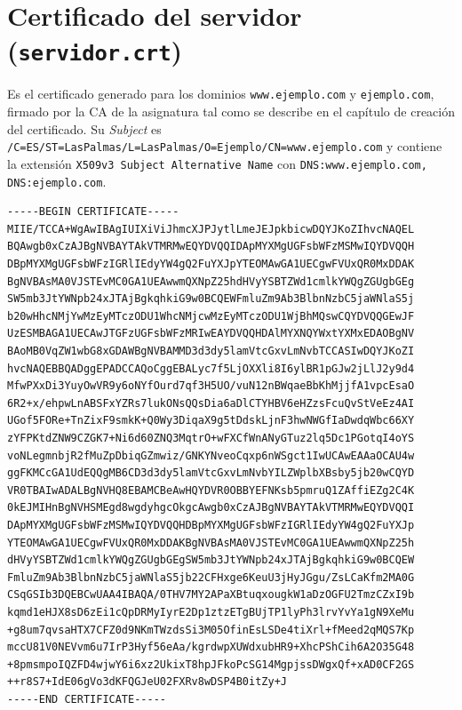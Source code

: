 \section{Certificado del servidor (\texttt{servidor.crt})}
Es el certificado generado para los dominios \texttt{www.ejemplo.com} y \texttt{ejemplo.com}, firmado por la CA de la asignatura tal como se describe en el capítulo de creación del certificado. Su \emph{Subject} es \texttt{/C=ES/ST=LasPalmas/L=LasPalmas/O=Ejemplo/CN=www.ejemplo.com} y contiene la extensión \texttt{X509v3 Subject Alternative Name} con \texttt{DNS:www.ejemplo.com, DNS:ejemplo.com}.

\begin{lstlisting}[basicstyle=\ttfamily\scriptsize, caption={servidor.crt en formato PEM}]
-----BEGIN CERTIFICATE-----
MIIE/TCCA+WgAwIBAgIUIXiViJhmcXJPJytlLmeJEJpkbicwDQYJKoZIhvcNAQEL
BQAwgb0xCzAJBgNVBAYTAkVTMRMwEQYDVQQIDApMYXMgUGFsbWFzMSMwIQYDVQQH
DBpMYXMgUGFsbWFzIGRlIEdyYW4gQ2FuYXJpYTEOMAwGA1UECgwFVUxQR0MxDDAK
BgNVBAsMA0VJSTEvMC0GA1UEAwwmQXNpZ25hdHVyYSBTZWd1cmlkYWQgZGUgbGEg
SW5mb3JtYWNpb24xJTAjBgkqhkiG9w0BCQEWFmluZm9Ab3BlbnNzbC5jaWNlaS5j
b20wHhcNMjYwMzEyMTczODU1WhcNMjcwMzEyMTczODU1WjBhMQswCQYDVQQGEwJF
UzESMBAGA1UECAwJTGFzUGFsbWFzMRIwEAYDVQQHDAlMYXNQYWxtYXMxEDAOBgNV
BAoMB0VqZW1wbG8xGDAWBgNVBAMMD3d3dy5lamVtcGxvLmNvbTCCASIwDQYJKoZI
hvcNAQEBBQADggEPADCCAQoCggEBALyc7f5LjOXXli8I6ylBR1pGJw2jLlJ2y9d4
MfwPXxDi3YuyOwVR9y6oNYfOurd7qf3H5UO/vuN12nBWqaeBbKhMjjfA1vpcEsaO
6R2+x/ehpwLnABSFxYZRs7lukONsQQsDia6aDlCTYHBV6eHZzsFcuQvStVeEz4AI
UGof5FORe+TnZixF9smkK+Q0Wy3DiqaX9g5tDdskLjnF3hwNWGfIaDwdqWbc66XY
zYFPKtdZNW9CZGK7+Ni6d60ZNQ3MqtrO+wFXCfWnANyGTuz2lq5Dc1PGotqI4oYS
voNLegmnbjR2fMuZpDbiqGZmwiz/GNKYNveoCqxp6nWSgct1IwUCAwEAAaOCAU4w
ggFKMCcGA1UdEQQgMB6CD3d3dy5lamVtcGxvLmNvbYILZWplbXBsby5jb20wCQYD
VR0TBAIwADALBgNVHQ8EBAMCBeAwHQYDVR0OBBYEFNKsb5pmruQ1ZAffiEZg2C4K
0kEJMIHnBgNVHSMEgd8wgdyhgcOkgcAwgb0xCzAJBgNVBAYTAkVTMRMwEQYDVQQI
DApMYXMgUGFsbWFzMSMwIQYDVQQHDBpMYXMgUGFsbWFzIGRlIEdyYW4gQ2FuYXJp
YTEOMAwGA1UECgwFVUxQR0MxDDAKBgNVBAsMA0VJSTEvMC0GA1UEAwwmQXNpZ25h
dHVyYSBTZWd1cmlkYWQgZGUgbGEgSW5mb3JtYWNpb24xJTAjBgkqhkiG9w0BCQEW
FmluZm9Ab3BlbnNzbC5jaWNlaS5jb22CFHxge6KeuU3jHyJGgu/ZsLCaKfm2MA0G
CSqGSIb3DQEBCwUAA4IBAQA/0THV7MY2APaXBtuqxougkW1aDzOGFU2TmzCZxI9b
kqmd1eHJX8sD6zEi1cQpDRMyIyrE2Dp1ztzETgBUjTP1lyPh3lrvYvYa1gN9XeMu
+g8um7qvsaHTX7CFZ0d9NKmTWzdsSi3M05OfinEsLSDe4tiXrl+fMeed2qMQS7Kp
mccU81V0NEVvm6u7IrP3Hyf56eAa/kgrdwpXUWdxubHR9+XhcPShCih6A2O35G48
+8pmsmpoIQZFD4wjwY6i6xz2UkixT8hpJFkoPcSG14MgpjssDWgxQf+xAD0CF2GS
++r8S7+IdE06gVo3dKFQGJeU02FXRv8wDSP4B0itZy+J
-----END CERTIFICATE-----
\end{lstlisting}

